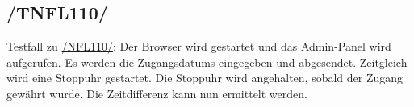 \subsection*{/TNFL110/}

\label{/TNFL110/} Testfall zu \hyperref[/NFL110/]{/NFL110/}: Der \Gls{Browser} wird gestartet und das \Gls{Admin-Panel} wird aufgerufen.
Es werden die \Glspl{Zugangsdatum} eingegeben und abgesendet. Zeitgleich wird eine Stoppuhr gestartet.
Die Stoppuhr wird angehalten, sobald der Zugang gewährt wurde.
Die Zeitdifferenz kann nun ermittelt werden.